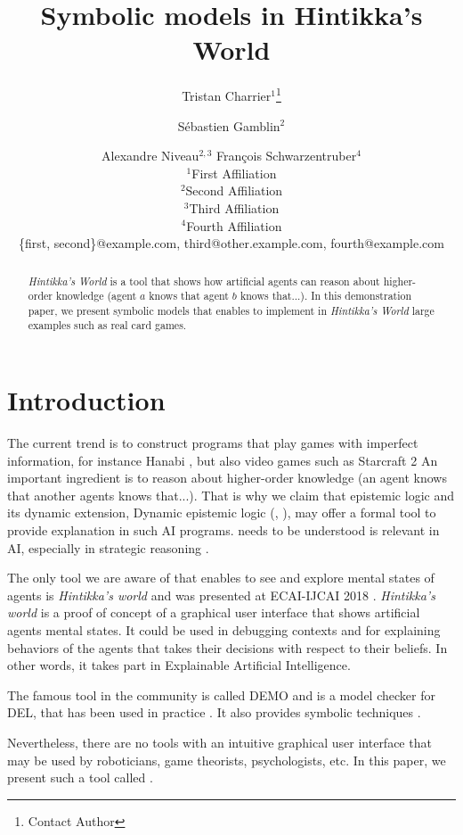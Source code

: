 \documentclass{article}
\title{Symbolic models in Hintikka's World}
\author{
Tristan Charrier$^1$\footnote{Contact Author}\and
Sébastien Gamblin$^2$\and
Alexandre Niveau$^{2,3}$\And
François Schwarzentruber$^4$\\
\affiliations
$^1$First Affiliation\\
$^2$Second Affiliation\\
$^3$Third Affiliation\\
$^4$Fourth Affiliation\\
\emails
\{first, second\}@example.com,
third@other.example.com,
fourth@example.com
}
\begin{document}
\newcommand{\mettel}{\textsf{MetTeL2}\xspace}

\maketitle

\begin{abstract}
	\emph{Hintikka's World} is a tool that shows how artificial agents can reason about higher-order knowledge (agent $a$ knows that agent $b$ knows that...).
	In this demonstration paper, we present symbolic models  that enables to implement in  \emph{Hintikka's World} large examples such as real card games. 
\end{abstract}



\section{Introduction}

The current trend is to construct programs that play games with imperfect information, for instance Hanabi \cite{}, but also video games such as Starcraft 2 \cite{} An important ingredient is to reason about higher-order knowledge (an agent knows that another agents knows that...). That is why we claim that epistemic logic and its dynamic extension, Dynamic epistemic logic (\cite{baltag1998logic}, \cite{DitmarschvdHoekKooi}), may offer a formal tool to provide explanation in such AI programs. needs to be understood is relevant in AI, especially in strategic reasoning \cite{DBLP:journals/ijgt/Aumann99}.

The only tool we are aware of that enables to see and explore mental states of agents is \emph{Hintikka's world} and was presented at ECAI-IJCAI 2018 \cite{}. 
\emph{Hintikka's world} is a proof of concept of a graphical user interface that shows artificial agents mental states. It could be used in debugging contexts and for explaining behaviors of the agents that takes their decisions with respect to their beliefs. In other words, it takes part in Explainable Artificial Intelligence.

The famous tool in the community is called DEMO \cite{van2007demo} and is a model checker for DEL, that has been used in practice \cite{DBLP:conf/paams/DitmarschEHSSS12}.
It also provides symbolic techniques \cite{DBLP:conf/lori/BenthemEGS15}.


Nevertheless, there are no tools with an intuitive graphical user interface that may be used by roboticians, game theorists, psychologists, etc. In this paper, we present such a tool called .%
\end{document}
